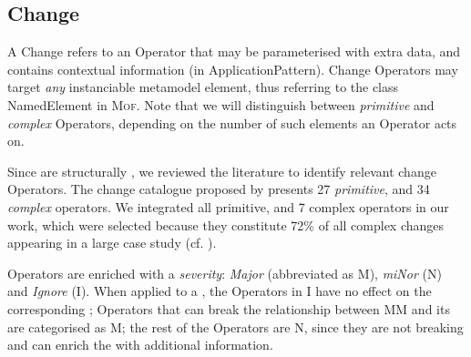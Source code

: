 \subsection{Change}
\label{sec:Suggestion:Change}

A \textsf{Change} refers to an \textsf{Operator} that may be parameterised with 
extra data, and contains contextual information (in \textsf{ApplicationPattern}). 
Change \textsf{Operator}s may target \emph{any} instanciable metamodel element, 
thus referring to the class \textsf{NamedElement} in \textsc{Mof}. Note that we 
will distinguish between \emph{primitive} and \emph{complex} \textsf{Operator}s,
depending on the number of such \metamodel elements an \textsf{Operator} acts on.

Since \viewtypes are structurally \metamodels, we reviewed the literature to
identify relevant change \textsf{Operator}s. The change catalogue proposed by 
\cite{herrmannsdoerfer_extensive_2011} presents 27 \emph{primitive}, and 34
\emph{complex} operators. We integrated all primitive, and 7 complex operators
in our work, which were selected because they constitute 72\% of all complex
changes appearing in a large case study (cf. \cite{khelladi_detecting_2015}). 

\textsf{Operator}s are enriched with a \emph{severity}: \emph{Major}
(abbreviated as \textsf{M}), \emph{miNor} (\textsf{N}) and \emph{Ignore} 
(\textsf{I}). 
When applied to a \metamodel, the \textsf{Operator}s in \textsf{I} have no effect
on the corresponding \viewtypes; \textsf{Operator}s that can break the relationship
between \textsf{MM }and its \viewtypes are categorised as \textsf{M}; the rest of the
\textsf{Operator}s are \textsf{N}, since they are not breaking and can enrich 
the \viewtypes with additional information.

